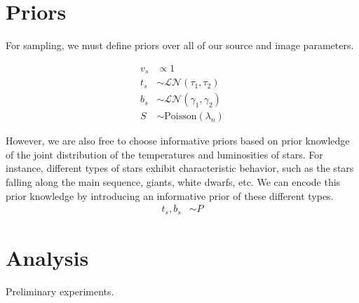 \documentclass[11pt]{article}
\begin{document}
\section{Priors}
For sampling, we must define priors over all of our source and image parameters.  

\begin{align}
  v_s &\propto 1 \\
  t_s &\sim \mathcal{LN}(\tau_1, \tau_2) \\
  b_s &\sim \mathcal{LN}(\gamma_1, \gamma_2) \\
  S   &\sim \textrm{Poisson}(\lambda_n) 
\end{align}


However, we are also free to choose informative priors based on prior knowledge of the joint distribution of the temperatures and luminosities of stars.  For instance, different types of stars exhibit characteristic behavior, such as the stars falling along the main sequence, giants, white dwarfs, etc.  We can encode this prior knowledge by introducing an informative prior of these different types.  
\begin{align}
  t_s, b_s &\sim P
\end{align}


\section{Analysis}

Preliminary experiments.  
\end{document}
